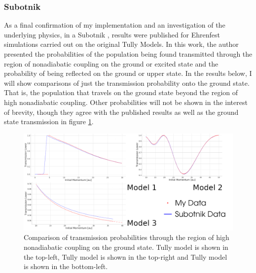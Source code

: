 \subsubsection{Subotnik}
As a final confirmation of my implementation and an investigation of the underlying physics, in a Subotnik \cite{SubotnikMomentumEhrenfest}, results were published for Ehrenfest simulations carried out on the  original Tully Models. In this work, the author presented the probabilities of the population being found transmitted through the region of nonadiabatic coupling on the ground or excited state and the probability of being reflected on the ground or upper state. In the results below, I will show comparisons of just the transmission probability onto the ground state. That is, the population that travels on the ground state beyond the region of high nonadiabatic coupling. Other probabilities will not be shown in the interest of brevity, though they agree with the published results as well as the ground state transmission in figure \ref{fig:SubotnikComparison}.
\begin{figure}[ht]
  \includegraphics[width=\textwidth]{../img/CTMQC/TullyModels/Ehrenfest_vs_Subotnik.png}
  \caption{\label{fig:SubotnikComparison}Comparison of transmission probabilities through the region of high nonadiabatic coupling on the ground state. Tully model  is shown in the top-left, Tully model  is shown in the top-right and Tully model  is shown in the bottom-left.}
\end{figure}
